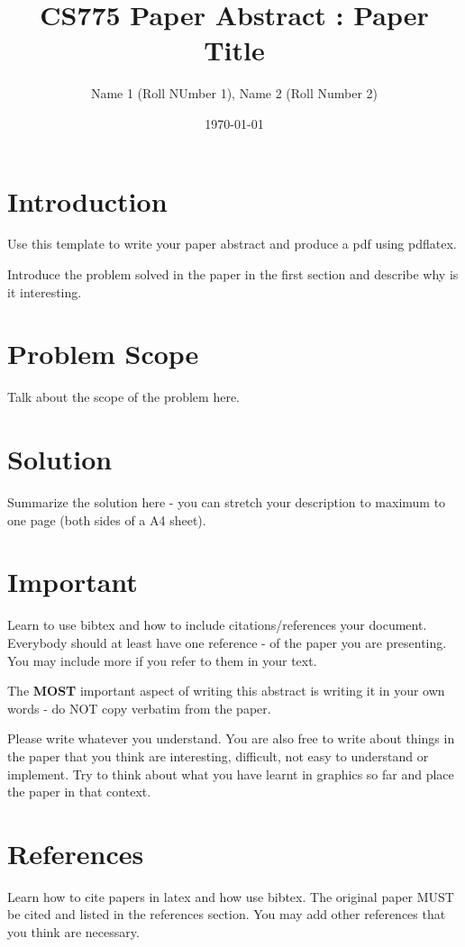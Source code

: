 \documentclass[a4paper,11pt,twocolumn]{article}
\title{CS775 Paper Abstract : Paper Title}
\author{Name 1 (Roll NUmber 1), Name 2 (Roll Number 2)}
\date{\today}
\begin{document}
\maketitle

\section{Introduction}
Use this template to write your paper abstract and produce a pdf using
pdflatex.

Introduce the problem solved in the paper in the first section and
describe why is it interesting.

\section{Problem Scope}
Talk about the scope of the problem here.

\section{Solution}
Summarize the solution here - you can stretch your description to
maximum to one page (both sides of a A4 sheet).

\section{Important}
Learn to use bibtex and how to include citations/references your
document. Everybody should at least have one reference - of the paper
you are presenting. You may include more if you refer to them in your
text.

The \textbf{MOST} important aspect of writing this abstract is writing
it in your own words - do NOT copy verbatim from the paper. 

Please write whatever you understand. You are also free to write about
things in the paper that you think are interesting, difficult, not
easy to understand or implement. Try to think about what you have
learnt in graphics so far and place the paper in that context.

\section{References}
Learn how to cite papers in latex and how use bibtex. The original paper MUST be cited and listed in the references section. You may add other references that you think are necessary.
\end{document}
